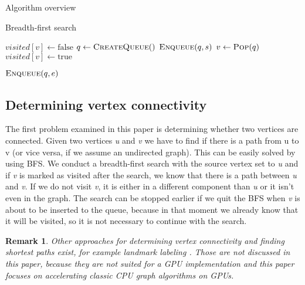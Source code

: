 \documentclass[a4paper,12pt,notitlepage,oneside]{article}
\newtheorem*{remark}{Remark}
\begin{document}
\begin{section}{Algorithm overview}
\begin{algorithm}
\caption{Breadth-first search}\label{alg:Bfs}
\begin{algorithmic}[1]
		\State $visited[v]\gets \text{false}$
	\EndFor
	\State
	\State $q\gets \Call{CreateQueue}$
	\State $\Call{Enqueue}{q, s}$
	\State
			\State $v\gets \Call{Pop}{q}$
			\State $visited[v]\gets \text{true}$
			
					\State $\Call{Enqueue}{q, e}$
				\EndIf
			\EndFor
	\EndWhile
\EndProcedure
\end{algorithmic}
\end{algorithm}

\subsection{Determining vertex connectivity}
The first problem examined in this paper is determining whether two vertices are connected. Given two vertices \textit{u} and \textit{v} we have to
find if there is a path from u to v (or vice versa, if we assume an undirected graph). This can be easily solved by using BFS. We conduct a breadth-first search
with the source vertex set to \textit{u} and if \textit{v} is marked as visited after the search, we know that there is a path between \textit{u} and \textit{v}.
If we do not visit \textit{v}, it is either in a different component than \textit{u} or it isn't even in the graph. The search can be stopped earlier if we quit
the BFS when \textit{v} is about to be inserted to the queue, because in that moment we already know that it will be visited, so it is not necessary to continue
with the search.

\begin{remark}
Other approaches for determining vertex connectivity and finding shortest paths exist, for example landmark labeling \cite{PrunedLabeling}.
Those are not discussed in this paper, because they are not suited for a GPU implementation and this paper focuses on accelerating classic CPU graph
algorithms on GPUs.
\end{remark}


\end{section}
\end{document}
